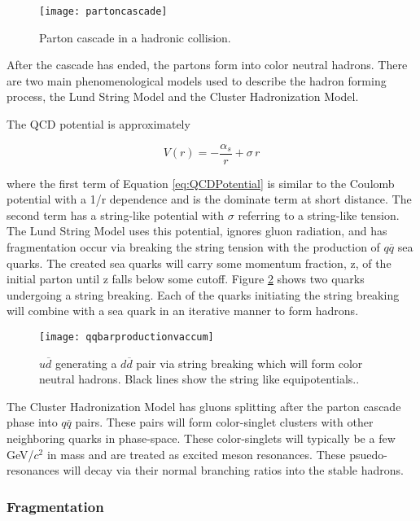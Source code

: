 \begin{figure}[h]
\texttt{[image: partoncascade]}
\centering
\caption{Parton cascade in a hadronic collision\cite{Webber:1994zd}.}
\label{fig:pcascade}
\end{figure}

\noindent
After the cascade has ended, the partons form into color neutral hadrons.  There are two main phenomenological models used to describe the hadron forming process, the Lund String Model and the Cluster Hadronization Model.  

The QCD potential is approximately

\begin{equation}
V(r) = - \frac{\alpha_{s}}{r} + \sigma \, r
\label{eq:QCDPotential}
\end{equation}

\noindent
where the first term of Equation \ref{eq:QCDPotential} is similar to the Coulomb potential with a 1/r dependence and is the dominate term at short distance.  The second term has a string-like potential with $\sigma$ referring to a string-like tension.  The Lund String Model uses this potential, ignores gluon radiation, and has fragmentation occur via breaking the string tension with the production of $q\overline{q}$ sea quarks.  The created sea quarks will carry some momentum fraction, z, of the initial parton until z falls below some cutoff.  Figure \ref{fig:qqbarstring} shows two quarks undergoing a string breaking.  Each of the quarks initiating the string breaking will combine with a sea quark in an iterative manner to form hadrons.  


\begin{figure}[h]
\texttt{[image: qqbarproductionvaccum]}
\centering
\caption{$u \overline{d}$ generating a $d \overline{d}$ pair via string breaking which will form color neutral hadrons.  Black lines show the string like equipotentials.\cite{Andersson:2002ap}.}
\label{fig:qqbarstring}
\end{figure}

The Cluster Hadronization Model has gluons splitting after the parton cascade phase into $q\overline{q}$ pairs.  These pairs will form color-singlet clusters with other neighboring quarks in phase-space.  These color-singlets will typically be a few GeV/\textit{$c^{2}$} in mass and are treated as excited meson resonances.  These psuedo-resonances will decay via their normal branching ratios into the stable hadrons\cite{Webber:1983if}.

\subsubsection{Fragmentation}

